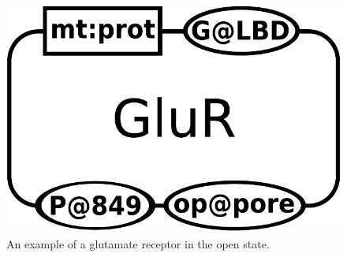 \begin{figure}[H]
  \centering
  \includegraphics[scale = 0.3]{examples/macromolecule-GluR}
  \caption{An example of a glutamate receptor in the open state.}
  \label{fig:example-glur}
\end{figure}




